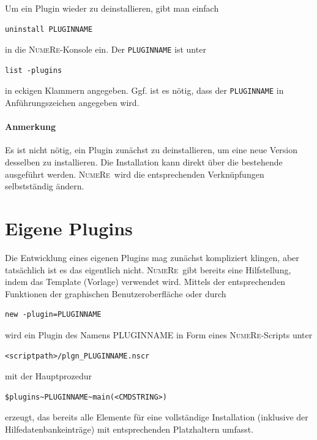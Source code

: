 \documentclass[DIV=14,headsepline,footsepline]{scrbook}
\newcommand{\NR}{\textsc{Nu\-me\-Re}}
\begin{document}
				Um ein Plugin wieder zu deinstallieren, gibt man einfach
				\begin{lstlisting}
uninstall PLUGINNAME
				\end{lstlisting}
				in die \NR-Konsole ein. Der \lstinline+PLUGINNAME+ ist unter
				\begin{lstlisting}
list -plugins
				\end{lstlisting}
				in eckigen Klammern angegeben. Ggf. ist es nötig, dass der \lstinline+PLUGINNAME+ in Anführungszeichen angegeben wird.
				\paragraph{Anmerkung}
					Es ist nicht nötig, ein Plugin zunächst zu deinstallieren, um eine neue Version desselben zu installieren. Die Installation kann direkt über die bestehende ausgeführt werden. \NR\ wird die entsprechenden Verknüpfungen selbstständig ändern.
			\section{Eigene Plugins}
				Die Entwicklung eines eigenen Plugins mag zunächst kompliziert klingen, aber tatsächlich ist es das eigentlich nicht. \NR\ gibt bereits eine Hilfstellung, indem das Template (Vorlage) verwendet wird. Mittels der entsprechenden Funktionen der graphischen Benutzeroberfläche oder durch
				\begin{lstlisting}
new -plugin=PLUGINNAME
				\end{lstlisting}
				wird ein Plugin des Namens PLUGINNAME in Form eines \NR-Scripts unter
				\begin{lstlisting}
<scriptpath>/plgn_PLUGINNAME.nscr
				\end{lstlisting}
				mit der Hauptprozedur
				\begin{lstlisting}
$plugins~PLUGINNAME~main(<CMDSTRING>)
				\end{lstlisting}
				erzeugt, das bereits alle Elemente für eine vollständige Installation (inklusive der Hilfedatenbankeinträge) mit entsprechenden Platzhaltern umfasst.
				
\end{document}
